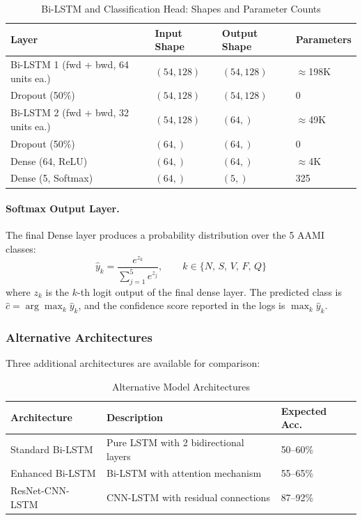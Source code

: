 \documentclass[12pt,a4paper]{article}
\begin{document}
\begin{table}[H]
\centering
\begin{tabular}{@{}llll@{}}
\toprule
\textbf{Layer} & \textbf{Input Shape} & \textbf{Output Shape} & \textbf{Parameters} \\
\midrule
Bi-LSTM 1 (fwd + bwd, 64 units ea.) & $(54, 128)$ & $(54, 128)$ & $\approx$198K \\
Dropout (50\%) & $(54, 128)$ & $(54, 128)$ & 0 \\
Bi-LSTM 2 (fwd + bwd, 32 units ea.) & $(54, 128)$ & $(64,)$ & $\approx$49K \\
Dropout (50\%) & $(64,)$ & $(64,)$ & 0 \\
Dense (64, ReLU) & $(64,)$ & $(64,)$ & $\approx$4K \\
Dense (5, Softmax) & $(64,)$ & $(5,)$ & 325 \\
\bottomrule
\end{tabular}
\caption{Bi-LSTM and Classification Head: Shapes and Parameter Counts}
\label{tab:bilstm_shapes}
\end{table}

\paragraph{Softmax Output Layer.}

The final Dense layer produces a probability distribution over the 5 AAMI classes:
\begin{equation}
    \hat{y}_k = \frac{e^{z_k}}{\displaystyle\sum_{j=1}^{5} e^{z_j}},
    \qquad k \in \{N,\,S,\,V,\,F,\,Q\}
\end{equation}
where $z_k$ is the $k$-th logit output of the final dense layer.
The predicted class is $\hat{c} = \arg\max_k \hat{y}_k$, and the confidence
score reported in the logs is $\max_k \hat{y}_k$.

\subsubsection{Alternative Architectures}

Three additional architectures are available for comparison:

\begin{table}[H]
\centering
\small
\begin{tabular}{@{}lp{5cm}l@{}}
\toprule
\textbf{Architecture} & \textbf{Description} & \textbf{Expected Acc.} \\ 
\midrule
Standard Bi-LSTM & Pure LSTM with 2 bidirectional layers & 50--60\% \\
Enhanced Bi-LSTM & Bi-LSTM with attention mechanism & 55--65\% \\
ResNet-CNN-LSTM & CNN-LSTM with residual connections & 87--92\% \\
\bottomrule
\end{tabular}
\caption{Alternative Model Architectures}
\label{tab:architectures}
\end{table}
\end{document}
